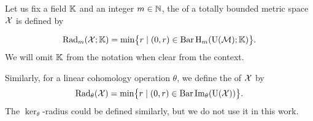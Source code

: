 \subsubsection{}

Let us fix a field \(\bK\) and an integer \(m \in \N\), the  of a totally bounded metric space \(\cX\) is defined by

\[
\Rad_m(\cX; \bK) = \min\set[\big]{r \mid (0, r) \in \barc \rH_m(\rU(\cM); \bK)}.
\]
We will omit \(\bK\) from the notation when clear from the context.

Similarly, for a linear cohomology operation \(\theta\), we define the  of \(\cX\) by
\[
\Rad_\theta(\cX) = \min\set[\big]{r \mid (0, r) \in \barc \img_\theta(\rU(\cX))}.
\]
The \(\ker_\theta\)-radius could be defined similarly, but we do not use it in this work.



%


